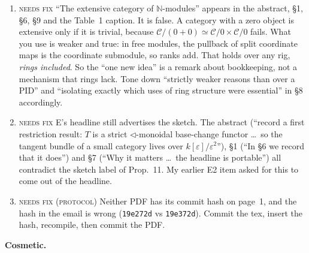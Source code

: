 \documentclass[11pt]{article}
\newcommand{\tri}{\mathbin{\triangleleft}}
\newcommand{\N}{\mathbb{N}}
\newcommand{\iss}[1]{\textsc{#1}}
\begin{document}
\begin{enumerate}[label=\textbf{N\arabic*.},leftmargin=*]
there. These sentences still overclaim:
\begin{itemize}[leftmargin=1.2em]
\item Thm~1/21, last sentence (``the container derivative is the only nontrivial \dots'');
\item the end of \S1 ``Contribution'';
\item \S8 (``upgrades \dots\ to `it is the only nontrivial one'\,'');
\item \S9 (``answers Cockett's question in its strongest form: \dots\ differentiation is the only
nontrivial way'').
\end{itemize}
All of these were on my ``do not say at Strathclyde'' list. Say instead: ``\dots\ exactly $\N$
and $W$; the second is the restriction of the SPoly/$\partial$ structure to linear maps.'' The
subtitle ``on the finite free $\N$-modules \emph{in Poly}'' is also wrong. These objects are not in
Poly with Poly's morphisms; write $\mathrm{Lin}(\mathrm{SPoly})$ or $\mathrm{FreeMod}_\N$.
\item \iss{needs fix} ``The extensive category of $\N$-modules'' appears in the abstract, \S1,
\S6, \S9 and the Table~1 caption. It is false. A category with a zero object is extensive only if
it is trivial, because $\mathcal C/(0+0)\simeq\mathcal C/0\times\mathcal C/0$ fails. What you use is
weaker and true: in free modules, the pullback of split coordinate maps is the coordinate
submodule, so ranks add. That holds over any rig, \emph{rings included}. So the ``one new idea''
is a remark about bookkeeping, not a mechanism that rings lack. Tone down ``strictly weaker
reasons than over a PID'' and ``isolating exactly which uses of ring structure were essential'' in
\S8 accordingly.
\item \iss{needs fix} E's headline still advertises the sketch. The abstract (``record a first
restriction result: $T$ is a strict $\tri$-monoidal base-change functor \dots\ so the tangent bundle
of a small category lives over $k[\varepsilon]/\varepsilon^2$''), \S1 (``In \S6 we record that it
does'') and \S7 (``Why it matters \dots\ the headline is portable'') all contradict the
sketch label of Prop.~11. My earlier E2 item asked for this to come out of the headline.
\item \iss{needs fix (protocol)} Neither PDF has its commit hash on page~1, and the hash in the
email is wrong (\texttt{19e272d} vs \texttt{19e372d}). Commit the tex, insert the hash, recompile,
then commit the PDF.
\end{enumerate}
\textbf{Cosmetic.}
\end{document}
